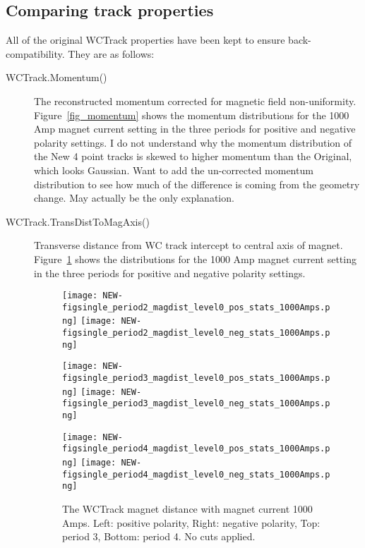   
  





\subsection{Comparing track properties}





 All of the original WCTrack properties have been kept to ensure back-compatibility. They are as follows:\\
 
 \begin{description}
 
 \item[WCTrack.Momentum()]{
 The reconstructed momentum corrected for magnetic field non-uniformity. Figure~\ref{fig_momentum} shows the momentum distributions for the 1000 Amp magnet current setting in the three periods for positive and negative polarity settings.
 I do not understand why the momentum distribution of the New 4 point tracks is skewed to higher momentum than the Original, which looks Gaussian. Want to add the un-corrected momentum distribution to see how much of the difference is coming from the geometry change. May actually be the only explanation.
 }
 
 
 
 \item[WCTrack.TransDistToMagAxis()]{
Transverse distance from WC track intercept to central axis of magnet. Figure~\ref{fig_magdist} shows the  distributions for the 1000 Amp magnet current setting in the three periods for positive and negative polarity settings.
  \begin{figure}[h]
    \centering   
     	\texttt{[image: NEW-figsingle\_period2\_magdist\_level0\_pos\_stats\_1000Amps.png]}
	 \texttt{[image: NEW-figsingle\_period2\_magdist\_level0\_neg\_stats\_1000Amps.png]}
	 
   	\texttt{[image: NEW-figsingle\_period3\_magdist\_level0\_pos\_stats\_1000Amps.png]}
	 \texttt{[image: NEW-figsingle\_period3\_magdist\_level0\_neg\_stats\_1000Amps.png]}
	 
 	\texttt{[image: NEW-figsingle\_period4\_magdist\_level0\_pos\_stats\_1000Amps.png]}
	 \texttt{[image: NEW-figsingle\_period4\_magdist\_level0\_neg\_stats\_1000Amps.png]}
   \caption[short]{The WCTrack magnet distance with magnet current 1000 Amps. Left: positive polarity, Right: negative polarity, Top: period 3, Bottom: period 4. No cuts applied.}
   \label{fig_magdist}
  \end{figure}
 
}
\end{description}
